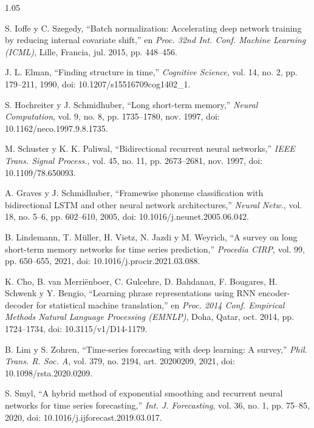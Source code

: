 \documentclass[12pt,letterpaper]{report}
\begin{document}
\begin{spacing}{1.05}
\begin{enumerate}[label={[\arabic*]}, leftmargin=0.9cm, labelsep=0.3cm, itemsep=4pt, parsep=0pt, topsep=0pt]
    \item \label{bib:41} S. Ioffe y C. Szegedy, ``Batch normalization: Accelerating deep network training by reducing internal covariate shift,'' en \textit{Proc. 32nd Int. Conf. Machine Learning (ICML)}, Lille, Francia, jul. 2015, pp. 448--456.

    \item \label{bib:42} J. L. Elman, ``Finding structure in time,'' \textit{Cognitive Science}, vol. 14, no. 2, pp. 179--211, 1990, doi: 10.1207/s15516709cog1402\_1.

    \item \label{bib:43} S. Hochreiter y J. Schmidhuber, ``Long short-term memory,'' \textit{Neural Computation}, vol. 9, no. 8, pp. 1735--1780, nov. 1997, doi: 10.1162/neco.1997.9.8.1735.

    \item \label{bib:44} M. Schuster y K. K. Paliwal, ``Bidirectional recurrent neural networks,'' \textit{IEEE Trans. Signal Process.}, vol. 45, no. 11, pp. 2673--2681, nov. 1997, doi: 10.1109/78.650093.

    \item \label{bib:45} A. Graves y J. Schmidhuber, ``Framewise phoneme classification with bidirectional LSTM and other neural network architectures,'' \textit{Neural Netw.}, vol. 18, no. 5--6, pp. 602--610, 2005, doi: 10.1016/j.neunet.2005.06.042.

    \item \label{bib:46} B. Lindemann, T. Müller, H. Vietz, N. Jazdi y M. Weyrich, ``A survey on long short-term memory networks for time series prediction,'' \textit{Procedia CIRP}, vol. 99, pp. 650--655, 2021, doi: 10.1016/j.procir.2021.03.088.

    \item \label{bib:47} K. Cho, B. van Merriënboer, C. Gulcehre, D. Bahdanau, F. Bougares, H. Schwenk y Y. Bengio, ``Learning phrase representations using RNN encoder-decoder for statistical machine translation,'' en \textit{Proc. 2014 Conf. Empirical Methods Natural Language Processing (EMNLP)}, Doha, Qatar, oct. 2014, pp. 1724--1734, doi: 10.3115/v1/D14-1179.

    \item \label{bib:48} B. Lim y S. Zohren, ``Time-series forecasting with deep learning: A survey,'' \textit{Phil. Trans. R. Soc. A}, vol. 379, no. 2194, art. 20200209, 2021, doi: 10.1098/rsta.2020.0209.

    \item \label{bib:49} S. Smyl, ``A hybrid method of exponential smoothing and recurrent neural networks for time series forecasting,'' \textit{Int. J. Forecasting}, vol. 36, no. 1, pp. 75--85, 2020, doi: 10.1016/j.ijforecast.2019.03.017.


\end{enumerate}
\end{spacing}
\end{document}
